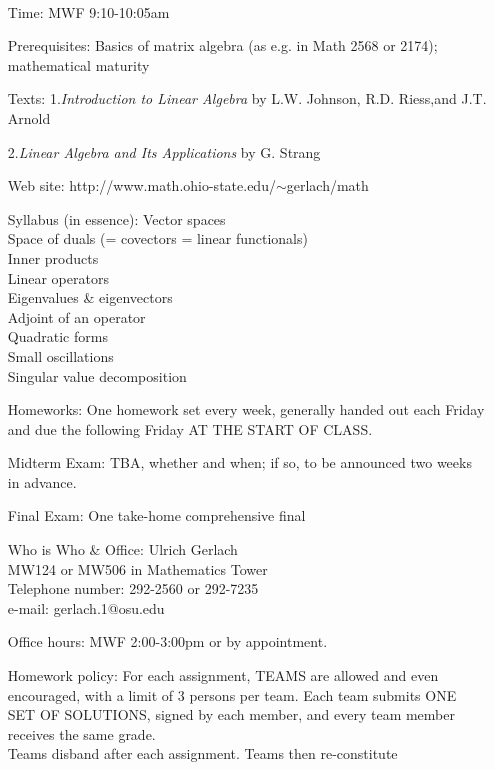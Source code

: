 \documentclass[12pt]{report}
\begin{document}
\\ 
\begin{itemize}
\item[Time:]	MWF 9:10-10:05am
\item[Prerequisites:] Basics of matrix algebra (as e.g. in Math 2568 or 2174); mathematical maturity
\item[Texts:] 1.\emph{Introduction to Linear Algebra} by L.W. Johnson,
R.D. Riess,and J.T. Arnold

2.\emph{Linear Algebra and Its Applications} by G. Strang
\item[Web site:]
http://www.math.ohio-state.edu/$\sim$gerlach/math
\item[Syllabus (in essence):]
Vector spaces\\
Space of duals (= covectors = linear functionals)\\
Inner products\\
Linear operators\\
Eigenvalues \& eigenvectors\\
Adjoint of an operator\\
Quadratic forms\\
Small oscillations\\
Singular value decomposition
\item[Homeworks:] One homework set every week, generally handed out
each Friday and due the following Friday AT THE START OF CLASS.
\item[Midterm Exam:] TBA, whether and when; if so, to be announced two weeks in advance. 
\item[Final Exam:]	One take-home comprehensive final
\item[Who is Who \& Office:]
Ulrich Gerlach\\
MW124 or MW506 in Mathematics Tower\\
Telephone number: 292-2560 or 292-7235\\
e-mail:  gerlach.1@osu.edu
\item[Office hours:]	MWF 2:00-3:00pm or by appointment.%
\item[Homework policy:]For each assignment, TEAMS are allowed and even
encouraged, with a limit of 3 persons per team.  Each team
submits ONE SET OF SOLUTIONS, signed by each member, and
every team member receives the same grade.\\
Teams disband after each assignment.  Teams then re-constitute

\end{itemize}
\end{document}
